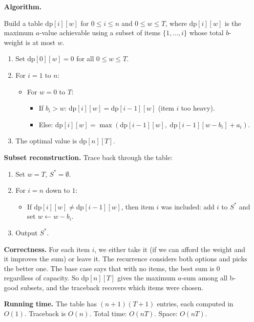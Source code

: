 \documentclass[10pt]{article}
\begin{document}
\textbf{Algorithm.}

Build a table $\text{dp}[i][w]$ for $0 \leq i \leq n$ and $0 \leq w \leq T$, where $\text{dp}[i][w]$ is the maximum $a$-value achievable using a subset of items $\{1,\ldots,i\}$ whose total $b$-weight is at most $w$.

\begin{enumerate}
\item Set $\text{dp}[0][w] = 0$ for all $0 \leq w \leq T$.
\item For $i = 1$ to $n$:
\begin{itemize}
    \item For $w = 0$ to $T$:
    \begin{itemize}
        \item If $b_i > w$: $\text{dp}[i][w] = \text{dp}[i-1][w]$ (item $i$ too heavy).
        \item Else: $\text{dp}[i][w] = \max(\text{dp}[i-1][w],\; \text{dp}[i-1][w - b_i] + a_i)$.
    \end{itemize}
\end{itemize}
\item The optimal value is $\text{dp}[n][T]$.
\end{enumerate}

\textbf{Subset reconstruction.}  Trace back through the table:
\begin{enumerate}
\item Set $w = T$, $S^* = \emptyset$.
\item For $i = n$ down to $1$:
\begin{itemize}
    \item If $\text{dp}[i][w] \neq \text{dp}[i-1][w]$, then item $i$ was included: add $i$ to $S^*$ and set $w \leftarrow w - b_i$.
\end{itemize}
\item Output $S^*$.
\end{enumerate}

\textbf{Correctness.}  For each item $i$, we either take it (if we can afford the weight and it improves the sum) or leave it.  The recurrence considers both options and picks the better one.  The base case says that with no items, the best sum is 0 regardless of capacity.  So $\text{dp}[n][T]$ gives the maximum $a$-sum among all b-good subsets, and the traceback recovers which items were chosen.

\textbf{Running time.}  The table has $(n+1)(T+1)$ entries, each computed in $O(1)$.  Traceback is $O(n)$.  Total time: $O(nT)$.  Space: $O(nT)$.
\end{document}
